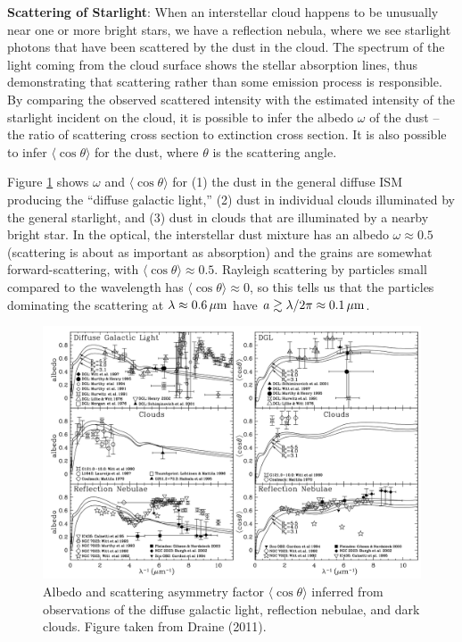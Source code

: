 \documentclass[a4paper,10pt]{article}
\begin{document}
{\noindent}\textbf{Scattering of Starlight}: When an interstellar cloud happens to be unusually near one or more bright stars, we have a reflection nebula, where we see starlight photons that have been scattered by the dust in the cloud. The spectrum of the light coming from the cloud surface shows the stellar absorption lines, thus demonstrating that scattering rather than some emission process is responsible. By comparing the observed scattered intensity with the estimated intensity of the starlight incident on the cloud, it is possible to infer the albedo $\omega$ of the dust -- the ratio of scattering cross section to extinction cross section. It is also possible to infer $\langle\cos\theta\rangle$ for the dust, where $\theta$ is the scattering angle.

{\noindent}Figure \ref{fig:albedo} shows $\omega$ and $\langle\cos\theta\rangle$ for (1) the dust in the general diffuse ISM producing the ``diffuse galactic light,'' (2) dust in individual clouds illuminated by the general starlight, and (3) dust in clouds that are illuminated by a nearby bright star. In the optical, the interstellar dust mixture has an albedo $\omega\approx0.5$ (scattering is about as important as absorption) and the grains are somewhat forward-scattering, with $\langle\cos\theta\rangle\approx0.5$. Rayleigh scattering by particles small compared to the wavelength has $\langle\cos\theta\rangle\approx0$, so this tells us that the particles dominating the scattering at $\lambda\approx0.6\,\mu{\rm m}$ have $a\gtrsim\lambda/2\pi\approx0.1\,\mu{\rm m}$.

\begin{figure}[t]
    \centering
    \includegraphics[width=16cm]{figures/albedo.png}
    \caption{\footnotesize{Albedo and scattering asymmetry factor $\langle\cos\theta\rangle$ inferred from observations of the diffuse galactic light, reflection nebulae, and dark clouds. Figure taken from Draine (2011).}}
    \label{fig:albedo}
\end{figure}
\end{document}
